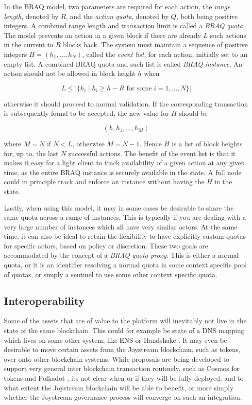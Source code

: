 \documentclass{article}
\begin{document}
In the BRAQ model, two parameters are required for each action, the \textit{range length}, denoted by $R$, and the \textit{action quota}, denoted by $Q$, both being positive integers. A combined range length and transaction limit is called a \textit{BRAQ quota}. The model prevents an action in a given block if there are already $L$ such actions in the current to $R$ blocks back. The system must maintain a sequence of positive integers $H=(h_1, \ldots, h_N)$, called the \textit{event list}, for each action, initially set to an empty list. A combined BRAQ quota and such list is called \textit{BRAQ instance}.
An action should not be allowed in block height $h$ when

$$ L \leq | \{ h_i \mid h_i \geq h-R\mbox{ for some } i=1,\ldots,N\} |$$ %

otherwise it should proceed to normal validation. If the corresponding transaction is subsequently found to be accepted, the new value for $H$ should be

$$ (h, h_1, \ldots, h_{M}) $$

where $M=N$ if $N < L$, otherwise $M = N - 1$. Hence $H$ is a list of block heights for, up to, the last $N$ successful actions. The benefit of the event list is that it makes it easy for a light client to track availability of a given action at any given time, as the entire BRAQ instance is securely available in the state. A full node could in principle track and enforce an instance without having the $H$ in the state.

Lastly, when using this model, it may in some cases be desirable to share the same quota across a range of instances. This is typically if you are dealing with a very large number of instances which all have very similar actors. At the same time, it can also be ideal to retain the flexibility to have explicitly custom quotas for specific actors, based on policy or discretion. These two goals are accommodated by the concept of a \textit{BRAQ quota proxy}. This is either a normal quota, or it is an identifier resolving a normal quota in some context specific pool of quotas, or simply a sentinel to use some other context specific quota.

\subsection{Interoperability}

Some of the assets that are of value to the platform will inevitably not live in the state of the same blockchain. This could for example be state of a DNS mapping which lives on some other system, like ENS \cite{ens} or Handshake \cite{handshake}. It may even be desirable to move certain  assets from the Joystream blockchain, such as tokens, over onto other blockchain systems. While proposals are being developed to support very general inter blockchain transaction routinely, such as Cosmos \cite{cosmos} for tokens and Polkadot \cite{polkadot}, its not clear when or if they will be fully deployed, and to what extent the Joystream blockchain will be able to benefit, or more simply whether the Joystream governance process will converge on such an integration.
\end{document}
